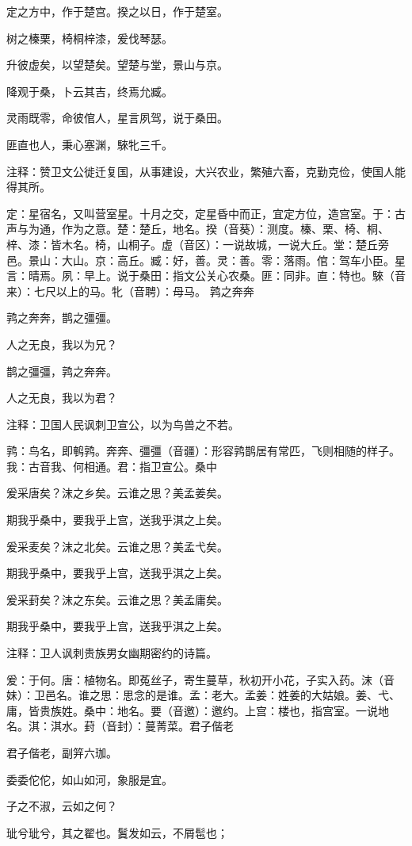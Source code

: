 \documentclass[12pt,UTF8]{ctexbook}
\begin{document}
定之方中，作于楚宫。揆之以日，作于楚室。

树之榛栗，椅桐梓漆，爰伐琴瑟。

升彼虚矣，以望楚矣。望楚与堂，景山与京。

降观于桑，卜云其吉，终焉允臧。

灵雨既零，命彼倌人，星言夙驾，说于桑田。

匪直也人，秉心塞渊，騋牝三千。

注释：赞卫文公徙迁复国，从事建设，大兴农业，繁殖六畜，克勤克俭，使国人能得其所。

定：星宿名，又叫营室星。十月之交，定星昏中而正，宜定方位，造宫室。于：古声与为通，作为之意。楚：楚丘，地名。揆（音葵）：测度。榛、栗、椅、桐、梓、漆：皆木名。椅，山桐子。虚（音区）：一说故城，一说大丘。堂：楚丘旁邑。景山：大山。京：高丘。臧：好，善。灵：善。零：落雨。倌：驾车小臣。星言：晴焉。夙：早上。说于桑田：指文公关心农桑。匪：同非。直：特也。騋（音来）：七尺以上的马。牝（音聘）：母马。 鹑之奔奔

鹑之奔奔，鹊之彊彊。

人之无良，我以为兄？

鹊之彊彊，鹑之奔奔。

人之无良，我以为君？

注释：卫国人民讽刺卫宣公，以为鸟兽之不若。

鹑：鸟名，即鹌鹑。奔奔、彊彊（音疆）：形容鹑鹊居有常匹，飞则相随的样子。我：古音我、何相通。君：指卫宣公。桑中

爰采唐矣？沫之乡矣。云谁之思？美孟姜矣。

期我乎桑中，要我乎上宫，送我乎淇之上矣。

爰采麦矣？沫之北矣。云谁之思？美孟弋矣。

期我乎桑中，要我乎上宫，送我乎淇之上矣。

爰采葑矣？沫之东矣。云谁之思？美孟庸矣。

期我乎桑中，要我乎上宫，送我乎淇之上矣。

注释：卫人讽刺贵族男女幽期密约的诗篇。

爰：于何。唐：植物名。即菟丝子，寄生蔓草，秋初开小花，子实入药。沫（音妹）：卫邑名。谁之思：思念的是谁。孟：老大。孟姜：姓姜的大姑娘。姜、弋、庸，皆贵族姓。桑中：地名。要（音邀）：邀约。上宫：楼也，指宫室。一说地名。淇：淇水。葑（音封）：蔓菁菜。君子偕老

君子偕老，副笄六珈。

委委佗佗，如山如河，象服是宜。

子之不淑，云如之何？

玼兮玼兮，其之翟也。鬒发如云，不屑髢也；
\end{document}
